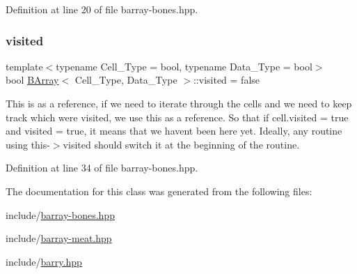 Definition at line 20 of file barray-\/bones.\+hpp.

\mbox{\label{class_b_array_ae0860bf21425397d1498f94da6518e85}} 
\subsubsection{\texorpdfstring{visited}{visited}}
{\footnotesize\ttfamily template$<$typename Cell\+\_\+\+Type = bool, typename Data\+\_\+\+Type = bool$>$ \\
bool \hyperlink{class_b_array}{B\+Array}$<$ Cell\+\_\+\+Type, Data\+\_\+\+Type $>$\+::visited = false}

This is as a reference, if we need to iterate through the cells and we need to keep track which were visited, we use this as a reference. So that if cell.\+visited = true and visited = true, it means that we haven\textquotesingle{}t been here yet. Ideally, any routine using this-\/$>$visited should switch it at the beginning of the routine. 

Definition at line 34 of file barray-\/bones.\+hpp.



The documentation for this class was generated from the following files\+:\begin{DoxyCompactItemize}
\item 
include/\hyperlink{barray-bones_8hpp}{barray-\/bones.\+hpp}\item 
include/\hyperlink{barray-meat_8hpp}{barray-\/meat.\+hpp}\item 
include/\hyperlink{barry_8hpp}{barry.\+hpp}\end{DoxyCompactItemize}
